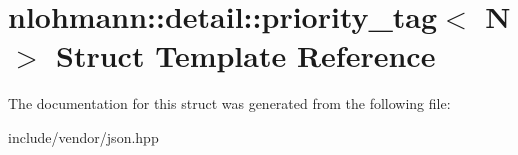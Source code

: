 \hypertarget{structnlohmann_1_1detail_1_1priority__tag}{}\section{nlohmann\+:\+:detail\+:\+:priority\+\_\+tag$<$ N $>$ Struct Template Reference}
\label{structnlohmann_1_1detail_1_1priority__tag}


The documentation for this struct was generated from the following file\+:\begin{DoxyCompactItemize}
\item 
include/vendor/json.\+hpp\end{DoxyCompactItemize}
